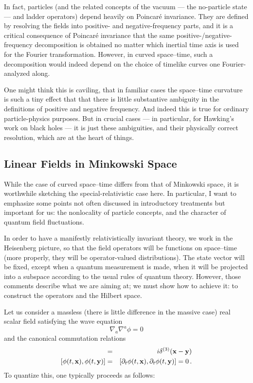 \documentclass[
%
draft    %
,numberedheadings 
,bibliocites
  ]
  {aipproc}
\begin{document}
In fact, particles (and the related concepts of the vacuum --- the no-particle state --- and ladder operators) depend heavily on Poincar\'e invariance.  They are defined by resolving the fields into positive- and negative-frequency parts, and it is a critical consequence of Poincar\'e invariance that the same positive-/negative-frequency decomposition is obtained no matter which inertial time axis is used for the Fourier transformation.  However, in curved space--time, such a decomposition would indeed depend on the choice of timelike curves one Fourier-analyzed along.

One might think this is caviling, that in familiar cases the space--time curvature is such a tiny effect that that there is little substantive ambiguity in the definitions of positive and negative frequency.  And indeed this is true for ordinary particle-physics purposes.  But in crucial cases --- in particular, for Hawking's work on black holes --- it is just these ambiguities, and their physically correct resolution, which are at the heart of things.





\subsection{Linear Fields in Minkowski Space}

While the case of curved space--time differs from that of Minkowski space, it is worthwhile sketching the special-relativistic case here.  In particular, I want to emphasize some points not often discussed in introductory treatments but important for us:  the nonlocality of particle concepts, and the character of quantum field fluctuations.

In order to have a manifestly relativistically invariant theory, we work in the Heisenberg picture, so that the field operators will be functions on space--time (more properly, they will be operator-valued distributions).  The state vector will be fixed, except when a quantum measurement is made, when it will be projected into a subspace according to the usual rules of quantum theory.  However, those comments describe what we are aiming at;  we must show how to achieve it:  to construct the operators and the Hilbert space.

Let us consider a massless (there is little difference in the massive case) real scalar field satisfying the wave equation
\begin{equation}
  \nabla _a\nabla ^a\phi =0
\end{equation}
and the canonical commutation relations
\begin{eqnarray} 
 [\partial _t\phi (t,{\bf x}),\phi (t,{\bf y})] &=&i\delta ^{(3)}({\bf x}-{\bf y})\\
 \left[\phi (t,{\bf x}),\phi (t,{\bf y})\right]&=&
 [\partial _t\phi (t,{\bf x}),\partial _t\phi (t,{\bf y})]=0 \, .
\end{eqnarray}
To quantize this, one typically proceeds as follows:
\end{document}
